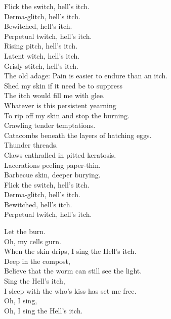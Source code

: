 Flick the switch, hell's itch. \\
Derma-glitch, hell's itch. \\
Bewitched, hell's itch. \\
Perpetual twitch, hell's itch. \\
Rising pitch, hell's itch. \\
Latent witch, hell's itch. \\
Grisly stitch, hell's itch. \\

The old adage: Pain is easier to endure than an itch. \\

Shed my skin if it need be to suppress \\
The itch would fill me with glee. \\
Whatever is this persistent yearning \\
To rip off my skin and stop the burning. \\
Crawling tender temptations. \\

Catacombs beneath the layers of hatching eggs. \\
Thunder threads. \\
Claws enthralled in pitted keratosis. \\
Lacerations peeling paper-thin. \\
Barbecue skin, deeper burying. \\

Flick the switch, hell's itch. \\
Derma-glitch, hell's itch. \\
Bewitched, hell's itch. \\
Perpetual twitch, hell's itch. \\


Let the  burn. \\
Oh, my cells gurn. \\
When the skin drips, I sing the Hell's itch. \\
Deep in the compost, \\
Believe that the worm can still see the light. \\
Sing the Hell's itch, \\
I sleep with the  who's kiss has set me free. \\
Oh, I sing, \\
Oh, I sing the Hell's itch. \\

